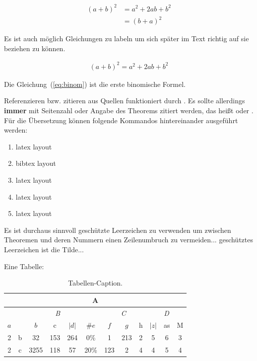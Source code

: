 \begin{align}
\left(a+b\right)^2&= a^2+2ab+b^2\nonumber\\
&=(b+a)^2
\end{align}

Es ist auch m\"oglich Gleichungen zu labeln um sich sp\"ater im Text richtig auf sie beziehen zu k\"onnen.

\begin{align}
\label{eq:binom}
\left(a+b\right)^2= a^2+2ab+b^2
\end{align}

Die Gleichung~(\ref{eq:binom}) ist die erste binomische Formel. 


Referenzieren bzw. zitieren aus Quellen funktioniert durch \cite{ToselliWidlund}. Es sollte allerdings \textbf{immer} mit Seitenzahl oder Angabe des Theorems zitiert werden, das hei\ss t \cite[S. 127]{ToselliWidlund} oder \cite[Theorem~4.19]{ToselliWidlund}.
F\"ur die \"Ubersetzung k\"onnen folgende Kommandos hintereinander ausgef\"uhrt werden:

\begin{enumerate}
\item latex layout
\item bibtex layout
\item latex layout
\item latex layout
\item latex layout
\end{enumerate}

Es ist durchaus sinnvoll gesch\"utzte Leerzeichen zu verwenden um zwischen Theoremen und deren Nummern einen Zeilenumbruch zu vermeiden... gesch\"utztes Leerzeichen ist die Tilde...

Eine Tabelle:

\begin{table}
\small
	\begin{center}
	\begin{tabular}[c]{|c|c|c|c|c|c|c|c|c|c|c|c|}
	\hline
	\multicolumn{12}{|c|}{\textbf{A}}\\
	\hline
	&\multicolumn{5}{c|}{\textit{B}}&\multicolumn{3}{c|}{\textit{C}}&\multicolumn{3}{c|}{\textit{D}}\\
	\hline$a$& &$b$&c&$|d|$ &$\#e$                &$f$  &$g$&h&$|z|$&as&M\\
	\hline
	2& b & 32 & 153 & 264 & 0\% &1 & 213& 2&5 &6 &3\\ 
	2& c &3255 & 118 & 57 & 20\% & 123& 2&4 &4 &5 &4\\ 
	\hline
	\end{tabular}
\caption{Tabellen-Caption.}
	\label{tab:reg2}
	\end{center}
\end{table}

